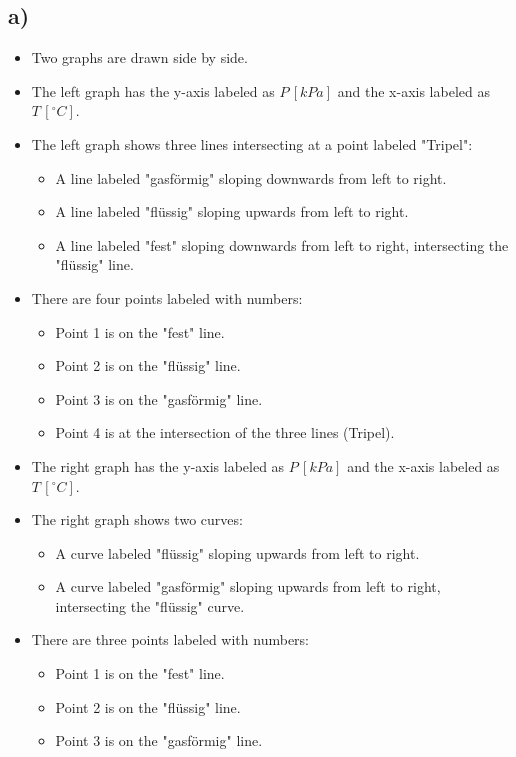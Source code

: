 

\subsection*{a)}

\begin{itemize}
    \item Two graphs are drawn side by side.
    \item The left graph has the y-axis labeled as $P \, [kPa]$ and the x-axis labeled as $T \, [^\circ C]$.
    \item The left graph shows three lines intersecting at a point labeled "Tripel":
        \begin{itemize}
            \item A line labeled "gasförmig" sloping downwards from left to right.
            \item A line labeled "flüssig" sloping upwards from left to right.
            \item A line labeled "fest" sloping downwards from left to right, intersecting the "flüssig" line.
        \end{itemize}
    \item There are four points labeled with numbers:
        \begin{itemize}
            \item Point 1 is on the "fest" line.
            \item Point 2 is on the "flüssig" line.
            \item Point 3 is on the "gasförmig" line.
            \item Point 4 is at the intersection of the three lines (Tripel).
        \end{itemize}
    \item The right graph has the y-axis labeled as $P \, [kPa]$ and the x-axis labeled as $T \, [^\circ C]$.
    \item The right graph shows two curves:
        \begin{itemize}
            \item A curve labeled "flüssig" sloping upwards from left to right.
            \item A curve labeled "gasförmig" sloping upwards from left to right, intersecting the "flüssig" curve.
        \end{itemize}
    \item There are three points labeled with numbers:
        \begin{itemize}
            \item Point 1 is on the "fest" line.
            \item Point 2 is on the "flüssig" line.
            \item Point 3 is on the "gasförmig" line.
        \end{itemize}
\end{itemize}